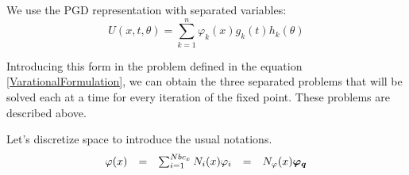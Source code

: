 \documentclass[12pt,a4paper]{article}
\begin{document}

We use the PGD representation with separated variables:
\begin{equation}
	U(x,t,\theta) = \sum_{k=1}^n \varphi_k(x) g_k(t)h_k(\theta)
\end{equation}

Introducing this form in the problem defined in the equation \ref{VarationalFormulation}, we can obtain the three separated problems that will be solved each at a time for every iteration of the fixed point. These problems are described above.


Let's discretize space to introduce the usual notations.
\begin{equation}
	\begin{array}{l c l c l}
		\varphi(x) &=& \sum_{i=1}^{Nbc_x}  N_i (x) \varphi_i &=& N_\varphi(x) \boldsymbol{\varphi_q} \\
	\end{array}
\end{equation}

\end{document}
